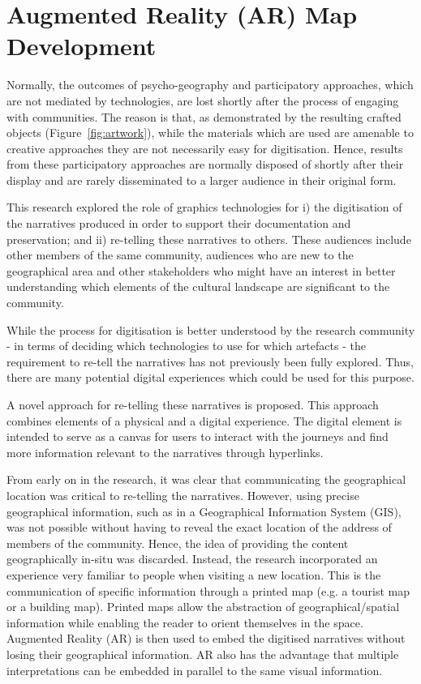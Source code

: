 \documentclass[acmlarge,screen,dvipsnames]{acmart}
\begin{document}
\section{Augmented Reality (AR) Map Development} \label{tech} Normally, the
outcomes of psycho-geography and participatory approaches, which are not
mediated by technologies, are lost shortly after the process of engaging with
communities. The reason is that, as demonstrated by the resulting crafted
objects (Figure~\ref{fig:artwork}), while the materials which are used  are
amenable to creative approaches they are not necessarily easy for
digitisation. Hence, results from these participatory approaches are normally
disposed of shortly after their display and are rarely disseminated to
 a larger audience in their original form. 

This research explored the role of graphics technologies for i) the
digitisation of the narratives produced in order to support their
documentation and preservation; and ii) re-telling these narratives to others.
These audiences include other members of the same community, audiences who are
new to the geographical area and other stakeholders who might have an interest
in better understanding which elements of the cultural landscape are
significant to the community.

While the process for digitisation is better understood by the research
community - in terms of deciding which technologies to use for which artefacts
- the requirement to re-tell the narratives has not previously been fully
explored. Thus, there are many potential digital experiences which could be
used for this purpose. 

A novel approach for re-telling these narratives is proposed. This approach
combines elements of a physical and a digital experience. The digital element
is intended to serve as a canvas for users to interact with the journeys and
find more information relevant to the narratives through hyperlinks. 

From early on in the research, it was clear that communicating the
geographical location was critical to re-telling the narratives. However,
using precise geographical information, such as in a Geographical Information
System (GIS), was not possible without having to reveal the exact location of
the address of members of the community. Hence, the idea of providing the
content geographically in-situ was discarded. Instead, the research
incorporated an experience very familiar to people when visiting a new
location. This is the communication of specific information through a printed
map (e.g. a tourist map or a building map). Printed maps allow the
abstraction of geographical/spatial information while enabling the reader to
orient themselves in the space. Augmented Reality (AR) is then used to embed
the digitised narratives without losing their geographical information. AR
also has the advantage that multiple interpretations can be embedded in
parallel to the same visual information. 
\end{document}
